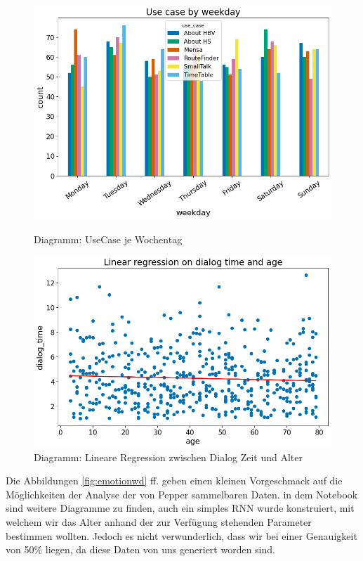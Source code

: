 \begin{figure}[H]
    \centering
    \begin{minipage}[b]{0.49\textwidth}
        \includegraphics[width=\textwidth]{Figures/analysis/usecasewd.png}
        \caption{Diagramm: UseCase je Wochentag}
        \label{fig:usecasewd}
    \end{minipage}
    \hfill
    \begin{minipage}[b]{0.49\textwidth}
        \includegraphics[width=\textwidth]{Figures/analysis/linreg.png}
        \caption{Diagramm: Lineare Regression zwischen Dialog Zeit und Alter}
        \label{fig:linreg}
    \end{minipage}
\end{figure}

Die Abbildungen \ref{fig:emotionwd} ff. geben einen kleinen Vorgeschmack auf die Möglichkeiten der Analyse der von Pepper sammelbaren Daten. in dem Notebook sind weitere Diagramme zu finden, auch ein simples RNN wurde konstruiert, mit welchem wir das Alter anhand der zur Verfügung stehenden Parameter bestimmen wollten. Jedoch es nicht verwunderlich, dass wir bei einer Genauigkeit von 50\% liegen, da diese Daten von uns generiert worden sind.

